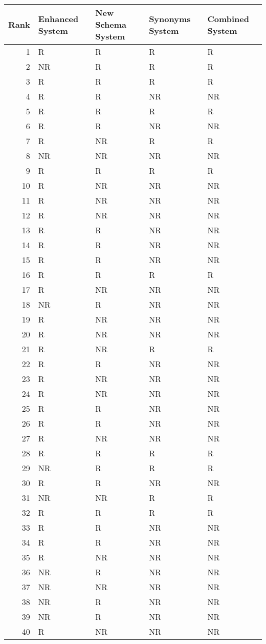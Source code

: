 \begin{tabular}{rllll}
\toprule
Rank & Enhanced System & New Schema System & Synonyms System & Combined System \\
\midrule
1 & R & R & R & R \\
2 & NR & R & R & R \\
3 & R & R & R & R \\
4 & R & R & NR & NR \\
5 & R & R & R & R \\
6 & R & R & NR & NR \\
7 & R & NR & R & R \\
8 & NR & NR & NR & NR \\
9 & R & R & R & R \\
10 & R & NR & NR & NR \\
11 & R & NR & NR & NR \\
12 & R & NR & NR & NR \\
13 & R & R & NR & NR \\
14 & R & R & NR & NR \\
15 & R & R & NR & NR \\
16 & R & R & R & R \\
17 & R & NR & NR & NR \\
18 & NR & R & NR & NR \\
19 & R & NR & NR & NR \\
20 & R & NR & NR & NR \\
21 & R & NR & R & R \\
22 & R & R & NR & NR \\
23 & R & NR & NR & NR \\
24 & R & NR & NR & NR \\
25 & R & R & NR & NR \\
26 & R & R & NR & NR \\
27 & R & NR & NR & NR \\
28 & R & R & R & R \\
29 & NR & R & R & R \\
30 & R & R & NR & NR \\
31 & NR & NR & R & R \\
32 & R & R & R & R \\
33 & R & R & NR & NR \\
34 & R & R & NR & NR \\
35 & R & NR & NR & NR \\
36 & NR & R & NR & NR \\
37 & NR & NR & NR & NR \\
38 & NR & R & NR & NR \\
39 & NR & R & NR & NR \\
40 & R & NR & NR & NR \\
\bottomrule
\end{tabular}
